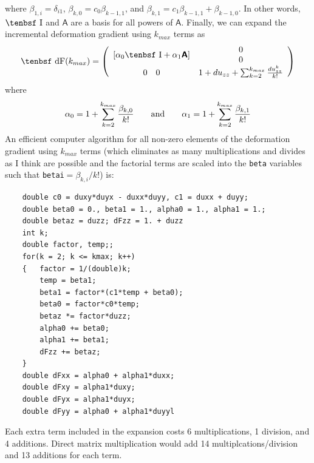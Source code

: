 \documentclass[11pt]{book}
\newcommand{\tens}[1]{\boldsymbol{\mathsf{#1}}}
\def\dF{\hbox{\tenbsf dF}}
\def\I{\hbox{\tenbsf I}}
\begin{document}
where $\beta_{1,i} = \delta_{i1}$, $\beta_{k,0}=c_0\beta_{k-1,1}$, and $\beta_{k,1}=c_1\beta_{k-1,1} + \beta_{k-1,0}$. In other words, $\I$ and $\tens A$ are a basis for all powers of $\tens A$. Finally, we can expand the incremental deformation gradient using $k_{max}$ terms as
\begin{equation}
    \dF({k_{max}}) = \left(\begin{array}{cc}
                [\alpha_0\I + \alpha_1\tens A] & \begin{array}{c} 0 \\ 0 \end{array} \\
                 0 \quad 0  & 1 + du_{zz} + \sum_{k=2}^{k_{max}} {du_{zz}^k\over k!}
              \end{array}\right)
\end{equation}
where
\begin{equation}
      \alpha_0 = 1 + \sum_{k=2}^{k_{max}} {\beta_{k,0}\over k!} \qquad {\rm and} \qquad
      \alpha_1 = 1 + \sum_{k=2}^{k_{max}} {\beta_{k,1}\over k!}
\end{equation}
An efficient computer algorithm for all non-zero elements of the deformation gradient using $k_{max}$ terms (which eliminates as many multiplications and divides as I think are possible and the factorial terms are scaled into the {\tt beta} variables such that {\tt betai}$=\beta_{k,i}/k!$) is:
\begin{verbatim}
    double c0 = duxy*duyx - duxx*duyy, c1 = duxx + duyy;
    double beta0 = 0., beta1 = 1., alpha0 = 1., alpha1 = 1.;
    double betaz = duzz; dFzz = 1. + duzz
    int k;
    double factor, temp;;
    for(k = 2; k <= kmax; k++)
    {   factor = 1/(double)k;
        temp = beta1;
        beta1 = factor*(c1*temp + beta0);
        beta0 = factor*c0*temp;
        betaz *= factor*duzz;
        alpha0 += beta0;
        alpha1 += beta1;
        dFzz += betaz;
    }
    double dFxx = alpha0 + alpha1*duxx;
    double dFxy = alpha1*duxy;
    double dFyx = alpha1*duyx;
    double dFyy = alpha0 + alpha1*duyyl
\end{verbatim}
Each extra term included in the expansion costs 6 multiplications, 1 division, and 4 additions. Direct matrix multiplication would add 14 multiplcations/division and 13 additions for each term.
\end{document}
